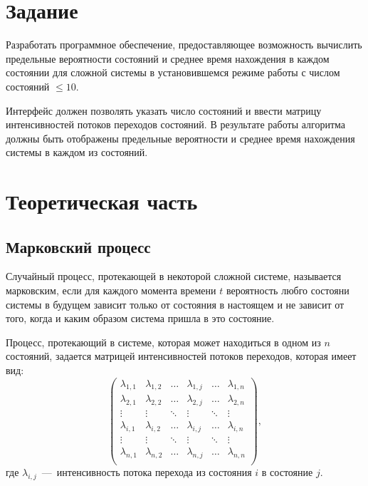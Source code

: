 \chapter{Задание}

Разработать программное обеспечение, предоставляющее возможность вычислить предельные вероятности состояний и среднее время нахождения в каждом состоянии для сложной системы в установившемся режиме работы с числом состояний $\leq 10$.

Интерфейс должен позволять указать число состояний и ввести матрицу интенсивностей потоков переходов состояний. В результате работы алгоритма должны быть отображены предельные вероятности и среднее время нахождения системы в каждом из состояний.
\chapter{Теоретическая часть}
\section{Марковский процесс}
Случайный процесс, протекающей в некоторой сложной системе, называется марковским, если для каждого момента времени $t$ вероятность любго состояни системы в будущем зависит только от состояния в настоящем и не зависит от того, когда и каким образом система пришла в это состояние.

Процесс, протекающий в системе, которая может находиться в одном из $n$ состояний, задается матрицей интенсивностей потоков переходов, которая имеет вид:
\begin{equation}
    \begin{pmatrix}
        \lambda_{1, 1} & \lambda_{1, 2} & \dots & \lambda_{1, j} & \dots &\lambda_{1, n}\\
        \lambda_{2, 1} & \lambda_{2, 2} & \dots & \lambda_{2, j} & \dots &\lambda_{2, n}\\
        \vdots & \vdots & \ddots &\vdots &\ddots &\vdots\\
        \lambda_{i, 1} & \lambda_{i, 2} & \dots & \lambda_{i, j} & \dots &\lambda_{i, n}\\
        \vdots & \vdots & \ddots &\vdots &\ddots &\vdots\\
        \lambda_{n, 1} & \lambda_{n, 2} & \dots & \lambda_{n, j} & \dots &\lambda_{n, n}\\
    \end{pmatrix},
\end{equation} 
где $\lambda_{i,j}$~---~интенсивность потока перехода из состояния $i$ в состояние $j$.

